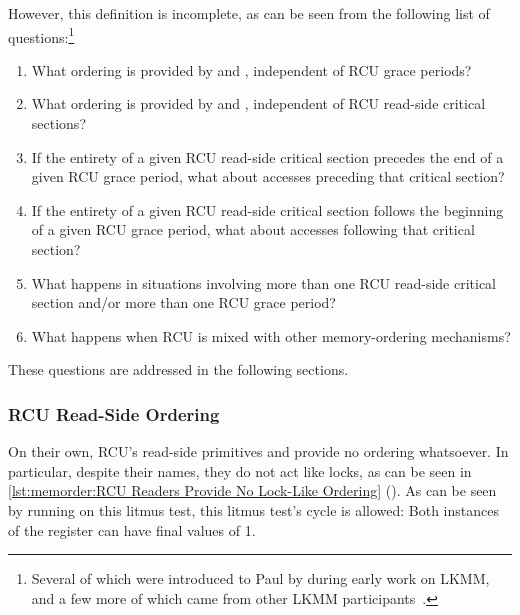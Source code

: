 However, this definition is incomplete, as can be seen from the following
list of questions:\footnote{
	Several of which were introduced to Paul by  during
	early work on LKMM, and a few more of which came from other
	LKMM participants~\cite{Alglave:2018:FSC:3173162.3177156}.}

\begin{enumerate}
\item	What ordering is provided by 
	and , independent of RCU grace periods?
\item	What ordering is provided by 
	and , independent of RCU read-side
	critical sections?
\item	If the entirety of a given RCU read-side critical section
	precedes the end of a given RCU grace period, what about
	accesses preceding that critical section?
\item	If the entirety of a given RCU read-side critical section
	follows the beginning of a given RCU grace period, what about
	accesses following that critical section?
\item	What happens in situations involving more than one RCU read-side
	critical section and/or more than one RCU grace period?
\item	What happens when RCU is mixed with other memory-ordering
	mechanisms?
\end{enumerate}

These questions are addressed in the following sections.

\subsubsection{RCU Read-Side Ordering}
\label{sec:memorder:RCU Read-Side Ordering}

On their own, RCU's read-side primitives  and
 provide no ordering whatsoever.
In particular, despite their names, they do not act like locks, as can
be seen in
\cref{lst:memorder:RCU Readers Provide No Lock-Like Ordering}
().
As can be seen by running  on this litmus test, this litmus
test's cycle is allowed: Both instances of the  register can
have final values of 1.

\begin{listing}[tb]

\caption{RCU Readers Provide No Lock-Like Ordering}
\label{lst:memorder:RCU Readers Provide No Lock-Like Ordering}
\end{listing}

